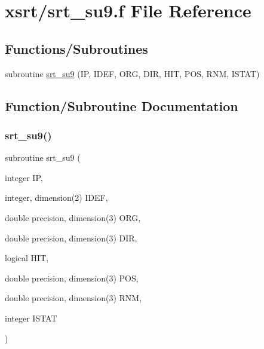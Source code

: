 \hypertarget{srt__su9_8f}{}\section{xsrt/srt\+\_\+su9.f File Reference}
\label{srt__su9_8f}
\subsection*{Functions/\+Subroutines}
\begin{DoxyCompactItemize}
\item 
subroutine \hyperlink{srt__su9_8f_a0738bb2d909f53abbd540d00beff2f94}{srt\+\_\+su9} (IP, I\+D\+EF, O\+RG, D\+IR, H\+IT, P\+OS, R\+NM, I\+S\+T\+AT)
\end{DoxyCompactItemize}


\subsection{Function/\+Subroutine Documentation}
\mbox{\label{srt__su9_8f_a0738bb2d909f53abbd540d00beff2f94}} 
\subsubsection{\texorpdfstring{srt\+\_\+su9()}{srt\_su9()}}
{\footnotesize\ttfamily subroutine srt\+\_\+su9 (\begin{DoxyParamCaption}\item[{integer}]{IP,  }\item[{integer, dimension(2)}]{I\+D\+EF,  }\item[{double precision, dimension(3)}]{O\+RG,  }\item[{double precision, dimension(3)}]{D\+IR,  }\item[{logical}]{H\+IT,  }\item[{double precision, dimension(3)}]{P\+OS,  }\item[{double precision, dimension(3)}]{R\+NM,  }\item[{integer}]{I\+S\+T\+AT }\end{DoxyParamCaption})}

